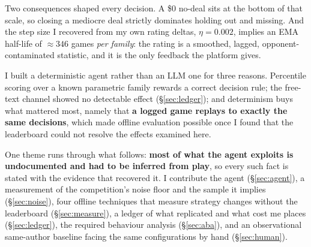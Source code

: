 \documentclass{article}
\newcommand{\tbf}[1]{\textbf{#1}}
\begin{document}
Two consequences shaped every decision. A \$0 no-deal sits at the bottom of that
scale, so closing a mediocre deal strictly dominates holding out and missing. And
the step size I recovered from my own rating deltas, $\eta{=}0.002$, implies an
EMA half-life of ${\approx}346$ games \emph{per family}: the rating is a smoothed,
lagged, opponent-contaminated statistic, and it is the only feedback the platform
gives.

I built a deterministic agent rather than an LLM one for three reasons. Percentile
scoring over a known parametric family rewards a correct decision rule; the
free-text channel showed no detectable effect (\S\ref{sec:ledger}); and determinism buys
what mattered most, namely that \tbf{a logged game replays to exactly the same
decisions}, which made offline evaluation possible once I found that the
leaderboard could not resolve the effects examined here.

One theme runs through what follows: \tbf{most of what the agent exploits is
undocumented and had to be inferred from play}, so every such fact is stated with
the evidence that recovered it. I contribute the agent (\S\ref{sec:agent}), a
measurement of the competition's noise floor and the sample it implies
(\S\ref{sec:noise}), four offline techniques that measure strategy changes
without the leaderboard (\S\ref{sec:measure}), a ledger of what replicated and
what cost me places (\S\ref{sec:ledger}), the required behaviour analysis
(\S\ref{sec:aba}), and an observational same-author baseline facing the same
configurations by hand (\S\ref{sec:human}).
\end{document}
